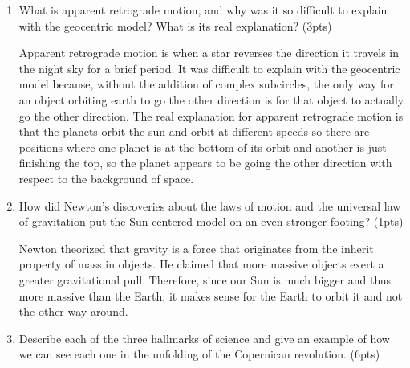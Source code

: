 \documentclass{article}
\begin{document}
\begin{enumerate}[start=9]
    \item What is apparent retrograde motion, and why was it so difficult to explain with the geocentric model? What is its real explanation? (3pts)
    
    Apparent retrograde motion is when a star reverses the direction it travels in the night sky for a brief period. 
    It was difficult to explain with the geocentric model because, without the addition of complex subcircles, the only way for an object orbiting earth to go the other direction is for that object to actually go the other direction.
    The real explanation for apparent retrograde motion is that the planets orbit the sun and orbit at different speeds so there are positions where one planet is at the bottom of its orbit and another is just finishing the top, so the planet appears to be going the other direction with respect to the background of space.

    \item How did Newton’s discoveries about the laws of motion and the universal law of gravitation put the Sun-centered model on an even stronger footing? (1pts)

    Newton theorized that gravity is a force that originates from the inherit property of mass in objects. He claimed that more massive objects exert a greater gravitational pull. Therefore, since our
    Sun is much bigger and thus more massive than the Earth, it makes sense for the Earth to orbit it and not the other way around.

    \item Describe each of the three hallmarks of science and give an example of how we can see each one in the unfolding of the Copernican revolution. (6pts)
    

\end{enumerate}
\end{document}
